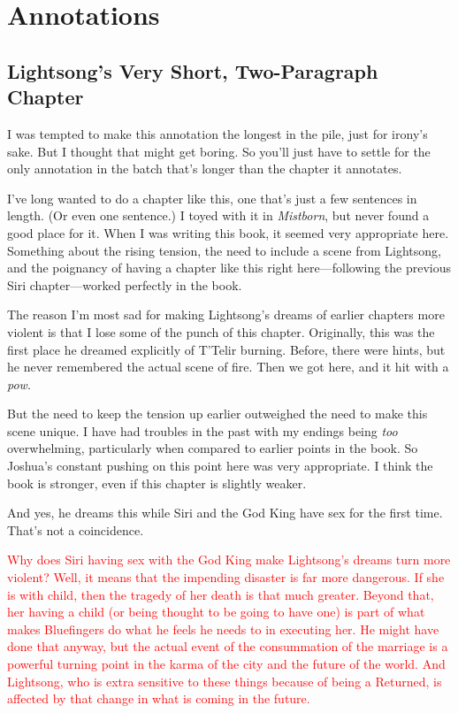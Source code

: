 \section*{Annotations}

\subsection*{Lightsong’s Very Short, Two-Paragraph Chapter}

I was tempted to make this annotation the longest in the pile, just for irony’s sake. But I thought that might get boring. So you’ll just have to settle for the only annotation in the batch that’s longer than the chapter it annotates.

I’ve long wanted to do a chapter like this, one that’s just a few sentences in length. (Or even one sentence.) I toyed with it in \textit{Mistborn}, but never found a good place for it. When I was writing this book, it seemed very appropriate here. Something about the rising tension, the need to include a scene from Lightsong, and the poignancy of having a chapter like this right here—following the previous Siri chapter—worked perfectly in the book.

The reason I’m most sad for making Lightsong’s dreams of earlier chapters more violent is that I lose some of the punch of this chapter. Originally, this was the first place he dreamed explicitly of T’Telir burning. Before, there were hints, but he never remembered the actual scene of fire. Then we got here, and it hit with a \textit{pow}.

But the need to keep the tension up earlier outweighed the need to make this scene unique. I have had troubles in the past with my endings being \textit{too} overwhelming, particularly when compared to earlier points in the book. So Joshua’s constant pushing on this point here was very appropriate. I think the book is stronger, even if this chapter is slightly weaker.

And yes, he dreams this while Siri and the God King have sex for the first time. That’s not a coincidence.

\textcolor{red}{
Why does Siri having sex with the God King make Lightsong’s dreams turn more violent? Well, it means that the impending disaster is far more dangerous. If she is with child, then the tragedy of her death is that much greater. Beyond that, her having a child (or being thought to be going to have one) is part of what makes Bluefingers do what he feels he needs to in executing her.
}
\textcolor{red}{
He might have done that anyway, but the actual event of the consummation of the marriage is a powerful turning point in the karma of the city and the future of the world. And Lightsong, who is extra sensitive to these things because of being a Returned, is affected by that change in what is coming in the future.
}



